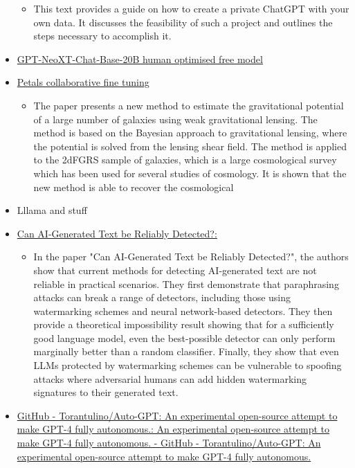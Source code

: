 \begin{itemize}
\begin{itemize}
  \item
    This text provides a guide on how to create a private ChatGPT with
    your own data. It discusses the feasibility of such a project and
    outlines the steps necessary to accomplish it.
  \end{itemize}
\item
  \href{https://huggingface.co/togethercomputer/GPT-NeoXT-Chat-Base-20B}{GPT-NeoXT-Chat-Base-20B
  human optimised free model}
\item
  \href{https://arxiv.org/abs/2209.01188}{Petals collaborative fine
  tuning}

  \begin{itemize}
  
  \item
    The paper presents a new method to estimate the gravitational
    potential of a large number of galaxies using weak gravitational
    lensing. The method is based on the Bayesian approach to
    gravitational lensing, where the potential is solved from the
    lensing shear field. The method is applied to the 2dFGRS sample of
    galaxies, which is a large cosmological survey which has been used
    for several studies of cosmology. It is shown that the new method is
    able to recover the cosmological
  \end{itemize}
\item
  Lllama and stuff
\item
  \href{https://arxiv.org/abs/2303.11156}{Can AI-Generated Text be
  Reliably Detected?:}

  \begin{itemize}
  
  \item
    In the paper "Can AI-Generated Text be Reliably Detected?", the
    authors show that current methods for detecting AI-generated text
    are not reliable in practical scenarios. They first demonstrate that
    paraphrasing attacks can break a range of detectors, including those
    using watermarking schemes and neural network-based detectors. They
    then provide a theoretical impossibility result showing that for a
    sufficiently good language model, even the best-possible detector
    can only perform marginally better than a random classifier.
    Finally, they show that even LLMs protected by watermarking schemes
    can be vulnerable to spoofing attacks where adversarial humans can
    add hidden watermarking signatures to their generated text.
  \end{itemize}
\item
  \href{https://github.com/Torantulino/Auto-GPT}{GitHub -
  Torantulino/Auto-GPT: An experimental open-source attempt to make
  GPT-4 fully autonomous.: An experimental open-source attempt to make
  GPT-4 fully autonomous. - GitHub - Torantulino/Auto-GPT: An
  experimental open-source attempt to make GPT-4 fully autonomous.}


\end{itemize}

